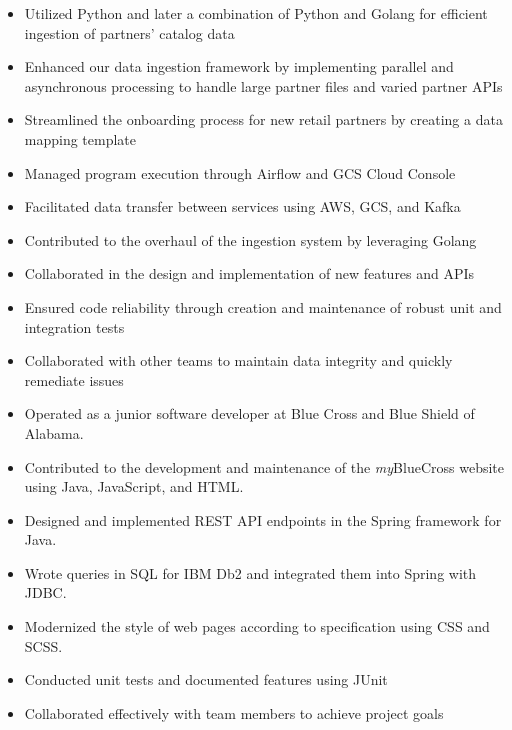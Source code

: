 \documentclass[10pt]{setzerresume}
\begin{document}
  \begin{itemize}[nosep]
    \item Utilized Python and later a combination of Python and Golang for efficient ingestion of partners' catalog data
    \item Enhanced our data ingestion framework by implementing parallel and asynchronous processing to handle large partner files and varied partner APIs
    \item Streamlined the onboarding process for new retail partners by creating a data mapping template
    \item Managed program execution through Airflow and GCS Cloud Console
    \item Facilitated data transfer between services using AWS, GCS, and Kafka
    \item Contributed to the overhaul of the ingestion system by leveraging Golang
    \item Collaborated in the design and implementation of new features and APIs
    \item Ensured code reliability through creation and maintenance of robust unit and integration tests
    \item Collaborated with other teams to maintain data integrity and quickly remediate issues
  \end{itemize}


  \begin{itemize}[nosep]
    \item Operated as a junior software developer at Blue Cross and Blue Shield of Alabama.
    \item Contributed to the development and maintenance of the \textit{my}BlueCross website using Java, JavaScript, and HTML.
    \item Designed and implemented REST API endpoints in the Spring framework for Java.
    \item Wrote queries in SQL for IBM Db2 and integrated them into Spring with JDBC. %
    \item Modernized the style of web pages according to specification using CSS and SCSS. %
    \item Conducted unit tests and documented features using JUnit
    \item Collaborated effectively with team members to achieve project goals
  \end{itemize}
\end{document}
